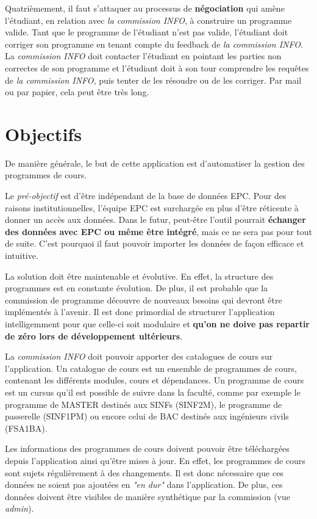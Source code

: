 Quatrièmement, il faut s'attaquer au processus de \textbf{négociation} qui amène l'étudiant, en relation avec \textit{la commission INFO}, à construire un programme valide. Tant que le programme de l'étudiant n'est pas valide, l'étudiant doit corriger son programme en tenant compte du feedback de \textit{la commission INFO}. La \textit{commission INFO} doit contacter l'étudiant en pointant les parties non correctes de son programme et l'étudiant doit à son tour comprendre les requêtes de \textit{la commission INFO}, puis tenter de les résoudre ou de les corriger. Par mail ou par papier, cela peut être très long. 
\clearpage


\section{Objectifs}
\label{objectifs}
De manière générale, le but de cette application est d'automatiser la gestion des programmes de cours. 


Le \textit{pré-objectif} est d'être indépendant de la base de données EPC. Pour des raisons institutionnelles, l'équipe EPC est surchargée en plus d'être réticente à donner un accès aux données. Dans le futur, peut-être l'outil pourrait \textbf{échanger des données avec EPC ou même être intégré}, mais ce ne sera pas pour tout de suite. C'est pourquoi il faut pouvoir importer les données de façon efficace et intuitive.
 
La solution doit être maintenable et évolutive. En effet, la structure des programmes est en constante évolution. De plus, il est probable que la commission de programme découvre de nouveaux besoins qui devront être implémentés à l'avenir. Il est donc primordial de structurer l'application intelligemment pour que celle-ci soit modulaire et \textbf{qu'on ne doive pas repartir de zéro lors de développement ultérieurs}.

La \textit{commission INFO} doit pouvoir apporter des catalogues de cours sur l'application. Un catalogue de cours est un ensemble de programmes de cours, contenant les différents modules, cours et dépendances. Un programme de cours est un cursus qu'il est possible de suivre dans la faculté, comme par exemple le programme de MASTER destinés aux SINFs (SINF2M), le programme de passerelle (SINF1PM) ou encore celui de BAC destinés aux ingénieurs civils (FSA1BA).  

Les informations des programmes de cours  doivent pouvoir être téléchargées depuis l'application ainsi qu'être mises à jour. En effet, les programmes de cours sont sujets régulièrement à des changements. Il est donc nécessaire que ces données ne soient pas ajoutées en \textit{"en dur"} dans l'application. De plus, ces données doivent être visibles de manière synthétique par la commission (vue \textit{admin}).

